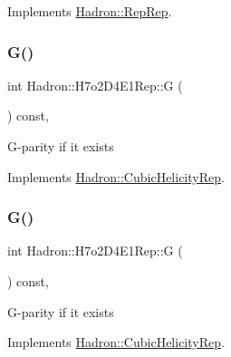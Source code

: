 Implements \mbox{\hyperlink{structHadron_1_1RepRep_a92c8802e5ed7afd7da43ccfd5b7cd92b}{Hadron\+::\+Rep\+Rep}}.

\mbox{\label{structHadron_1_1H7o2D4E1Rep_af37296fd1ce6d09f1f32fdcf854c0de8}} 
\subsubsection{\texorpdfstring{G()}{G()}\hspace{0.1cm}{\footnotesize\ttfamily [1/3]}}
{\footnotesize\ttfamily int Hadron\+::\+H7o2\+D4\+E1\+Rep\+::G (\begin{DoxyParamCaption}{ }\end{DoxyParamCaption}) const\hspace{0.3cm}{\ttfamily [inline]}, {\ttfamily [virtual]}}

G-\/parity if it exists 

Implements \mbox{\hyperlink{structHadron_1_1CubicHelicityRep_a50689f42be1e6170aa8cf6ad0597018b}{Hadron\+::\+Cubic\+Helicity\+Rep}}.

\mbox{\label{structHadron_1_1H7o2D4E1Rep_af37296fd1ce6d09f1f32fdcf854c0de8}} 
\subsubsection{\texorpdfstring{G()}{G()}\hspace{0.1cm}{\footnotesize\ttfamily [2/3]}}
{\footnotesize\ttfamily int Hadron\+::\+H7o2\+D4\+E1\+Rep\+::G (\begin{DoxyParamCaption}{ }\end{DoxyParamCaption}) const\hspace{0.3cm}{\ttfamily [inline]}, {\ttfamily [virtual]}}

G-\/parity if it exists 

Implements \mbox{\hyperlink{structHadron_1_1CubicHelicityRep_a50689f42be1e6170aa8cf6ad0597018b}{Hadron\+::\+Cubic\+Helicity\+Rep}}.

\mbox{\label{structHadron_1_1H7o2D4E1Rep_af37296fd1ce6d09f1f32fdcf854c0de8}} 
